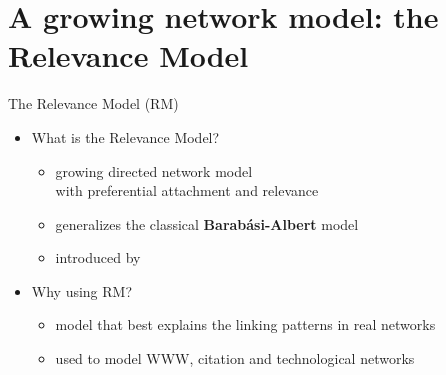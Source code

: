 \section{A growing network model: the Relevance Model}

\begin{frame}{The Relevance Model (RM)}
    \begin{itemize}
        \item \alert{What} is the Relevance Model?
        \begin{itemize}
            \item growing directed network model \\ with \alert{preferential attachment} and \alert{relevance}
            \item generalizes the classical \textbf{Barabási-Albert} model
            \item introduced by~\cite{Medo2011}
        \end{itemize}

        \item \alert{Why} using RM?
        \begin{itemize}
            \item model that best explains the linking patterns in real networks
            \item used to model WWW, citation and technological networks
        \end{itemize}
    \end{itemize}
\end{frame}

